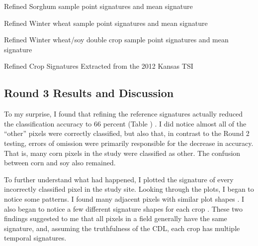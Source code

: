 \begin{ssfigure}
  \centering
  
  \caption{Refined Sorghum sample point signatures and mean signature}
    \label{fig:KSsorghumrefinedsigs}
\end{ssfigure}

\begin{ssfigure}
  \centering
  
  \caption{Refined Winter wheat sample point signatures and mean signature}
    \label{fig:KSwheatrefinedsigs}
\end{ssfigure}

\begin{ssfigure}
  \centering
  
  \caption{Refined Winter wheat/soy double crop sample point signatures and mean signature}
    \label{fig:KSwheatsoyrefinedsigs}
\end{ssfigure}

\begin{ssfigure}
  \centering
  
  \caption{Refined Crop Signatures Extracted from the 2012 Kansas TSI}
  \label{fig:KSenvisigs}
\end{ssfigure}


\subsection*{Round 3 Results and Discussion}



To my surprise, I found that refining the reference signatures actually reduced the classification accuracy to 66 percent (Table )
. I did notice almost all of the “other” pixels were correctly classified, but also that, in contrast to the Round 2 testing, errors of omission were primarily responsible for the decrease in accuracy. That is, many corn pixels in the study were classified as other. The confusion between corn and soy also remained.

To further understand what had happened, I plotted the signature of every incorrectly classified pixel in the study site. Looking through the plots, I began to notice some patterns. I found many adjacent pixels with similar plot shapes . I also began to notice a few different signature shapes for each crop . These two findings suggested to me that all pixels in a field generally have the same signature, and, assuming the truthfulness of the CDL, each crop has multiple temporal signatures.

